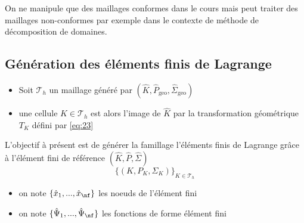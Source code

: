 \begin{remark}[\Feel]
  \label{rem:19}
  On ne manipule que des maillages conformes dans le cours mais \Feel peut
  traiter des maillages non-conformes par exemple dans le contexte de méthode
  de décomposition de domaines.
\end{remark}


\subsection{Génération des éléments finis de Lagrange}


\begin{itemize}
\item Soit $\mathcal{T}_h$ un maillage généré par $(\hat{K},
  \hat{P}_{\mathrm{geo}}, \hat{\Sigma}_{\mathrm{geo}})$
\item une cellule $K \in \mathcal{T}_h$ est alors l'image de  $\hat{K}$ par la
  transformation géométrique $T_K$ défini par \eqref{eq:23}
\end{itemize}

L'objectif à présent est de générer la famillage l'éléments finis de Lagrange
grâce à l'élément fini de référence $(\hat{K},\hat{P}, \hat{\Sigma})$
\begin{equation}
  \label{eq:28}
  \{(K,P_K,\Sigma_K)\}_{K \in \mathcal{T}_h}
\end{equation}
\begin{itemize}
\item on note $\{\hat{x}_1,...,\hat{x}_{\nf}\}$ les noeuds de l'élément fini
\item on note $\{\hat{\Psi}_1,...,\hat{\Psi}_{\nf}\}$ les fonctions de forme
  élément fini
\end{itemize}

